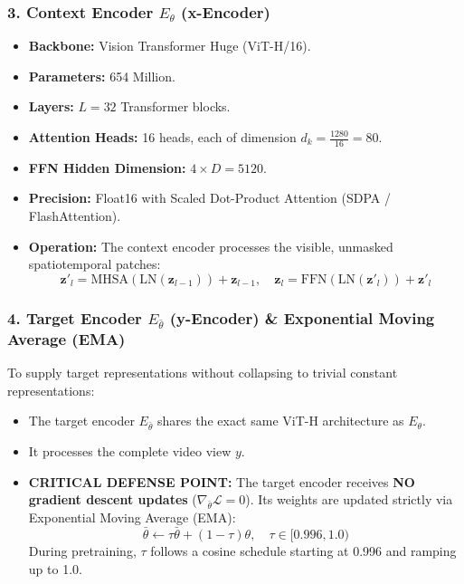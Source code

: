 \documentclass[a4paper, 11pt]{article}
\begin{document}
\subsubsection{3. Context Encoder \texorpdfstring{$E_\theta$}{E\_theta} (x-Encoder)}
\begin{itemize}
    \item \textbf{Backbone:} Vision Transformer Huge (ViT-H/16).
    \item \textbf{Parameters:} 654 Million.
    \item \textbf{Layers:} $L = 32$ Transformer blocks.
    \item \textbf{Attention Heads:} 16 heads, each of dimension $d_k = \frac{1280}{16} = 80$.
    \item \textbf{FFN Hidden Dimension:} $4 \times D = 5120$.
    \item \textbf{Precision:} Float16 with Scaled Dot-Product Attention (SDPA / FlashAttention).
    \item \textbf{Operation:} The context encoder processes the visible, unmasked spatiotemporal patches:
    \begin{equation}
        \mathbf{z}'_l = \text{MHSA}(\text{LN}(\mathbf{z}_{l-1})) + \mathbf{z}_{l-1}, \quad \mathbf{z}_l = \text{FFN}(\text{LN}(\mathbf{z}'_l)) + \mathbf{z}'_l
    \end{equation}
\end{itemize}

\subsubsection{4. Target Encoder \texorpdfstring{$E_{\bar{\theta}}$}{E\_theta\_bar} (y-Encoder) \& Exponential Moving Average (EMA)}
To supply target representations without collapsing to trivial constant representations:
\begin{itemize}
    \item The target encoder $E_{\bar{\theta}}$ shares the exact same ViT-H architecture as $E_\theta$.
    \item It processes the complete video view $y$.
    \item \textbf{CRITICAL DEFENSE POINT:} The target encoder receives \textbf{NO gradient descent updates} ($\nabla_{\bar{\theta}} \mathcal{L} = 0$). Its weights are updated strictly via Exponential Moving Average (EMA):
    \begin{equation}
        \bar{\theta} \leftarrow \tau \bar{\theta} + (1 - \tau) \theta, \quad \tau \in [0.996, 1.0)
    \end{equation}
    During pretraining, $\tau$ follows a cosine schedule starting at 0.996 and ramping up to 1.0.
\end{itemize}
\end{document}
